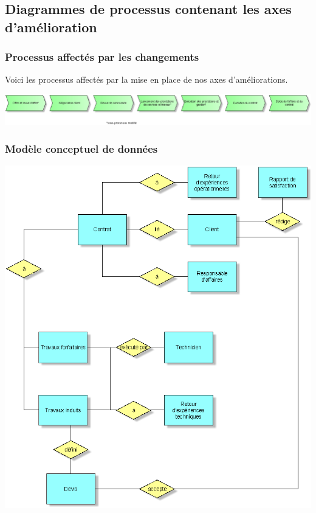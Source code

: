 \begin{itemize}
\subsection{Diagrammes de processus contenant les axes d'amélioration}
\subsubsection{Processus affectés par les changements}

Voici les processus affectés par la mise en place de nos axes d'améliorations.
\begin {center}
\includegraphics[width=\textwidth]{png_cible_fonctionnelle/DCPV.png}
\end {center}


\subsubsection{Modèle conceptuel de données}

\begin {center}
\includegraphics[width=\textwidth]{png_cible_fonctionnelle/MCD.png}
\end {center}



\end{itemize}
